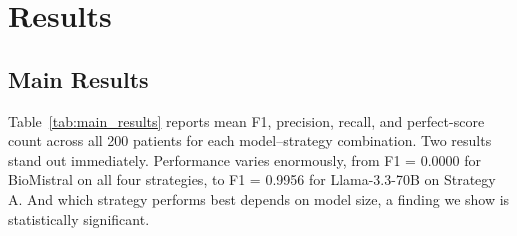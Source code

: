 \section{Results}
\label{sec:results}

\subsection{Main Results}

Table~\ref{tab:main_results} reports mean F1, precision, recall, and perfect-score
count across all 200 patients for each model--strategy combination. Two results stand out immediately. Performance varies enormously, from F1 = 0.0000 for
BioMistral on all four strategies, to F1 = 0.9956 for Llama-3.3-70B on Strategy A.
And which strategy performs best depends on model size, a finding we show is
statistically significant.

